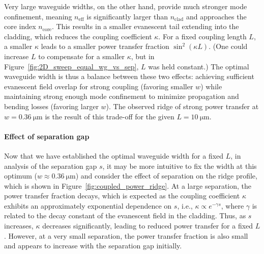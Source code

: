 \documentclass[10pt, a4paper]{article}
\begin{document}
Very large waveguide widths, on the other hand, provide much stronger mode confinement, meaning \(n_\text{eff}\) is significantly larger than \(n_\text{clad}\) and approaches the core index \(n_\text{core}\).
This results in a smaller evanescent tail extending into the cladding, which reduces the coupling coefficient \(\kappa\). For a fixed coupling length \(L\), a smaller \(\kappa\) leads to a smaller power transfer fraction \(\sin^2(\kappa L)\).
(One could increase \(L\) to compensate for a smaller \(\kappa\), but in Figure~\ref{fig:2D_sweep_equal_wg_vs_sep}, \(L\) was held constant.)
The optimal waveguide width is thus a balance between these two effects: achieving sufficient evanescent field overlap for strong coupling (favoring smaller \(w\)) while maintaining strong enough mode confinement to minimize propagation and bending losses (favoring larger \(w\)).
The observed ridge of strong power transfer at \(w=\SI{0.36}{\um}\) is the result of this trade-off for the given \(L=\SI{10}{\um}\).

\paragraph{Effect of separation gap}

Now that we have established the optimal waveguide width for a fixed \(L\),
in analysis of the separation gap \(s\), it may be more intuitive to fix the width at this optimum (\(w \approx \SI{0.36}{\um}\)) and consider the effect of separation on the ridge profile,
which is shown in Figure~\ref{fig:coupled_power_ridge}.
At a large separation, the power transfer fraction decays, which is expected as the coupling coefficient \(\kappa\) exhibits an approximately exponential dependence on \(s\), i.e., \(\kappa \propto e^{-\gamma s}\), where \(\gamma\) is related to the decay constant of the evanescent field in the cladding\autocite{dolph5CharacteristicsEvanescent2025}. Thus, as \(s\) increases, \(\kappa\) decreases significantly, leading to reduced power transfer for a fixed \(L\).
However, at a very small separation, the power transfer fraction is also small and appears to increase with the separation gap initially.

\end{document}
